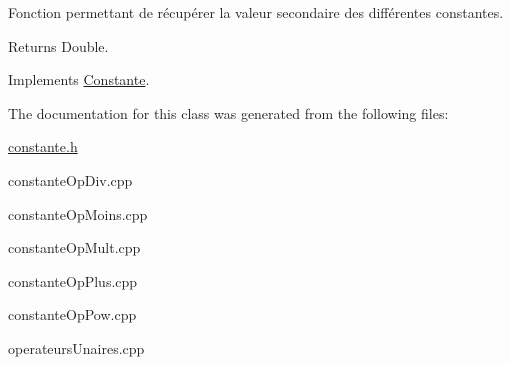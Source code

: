 Fonction permettant de récupérer la valeur secondaire des différentes constantes. 

\begin{DoxyReturn}{Returns}
Double. 
\end{DoxyReturn}


Implements \hyperlink{class_constante_aa0602d62c04f28f7bda68723f5dbc48b}{Constante}.



The documentation for this class was generated from the following files\-:\begin{DoxyCompactItemize}
\item 
\hyperlink{constante_8h}{constante.\-h}\item 
constante\-Op\-Div.\-cpp\item 
constante\-Op\-Moins.\-cpp\item 
constante\-Op\-Mult.\-cpp\item 
constante\-Op\-Plus.\-cpp\item 
constante\-Op\-Pow.\-cpp\item 
operateurs\-Unaires.\-cpp\end{DoxyCompactItemize}
